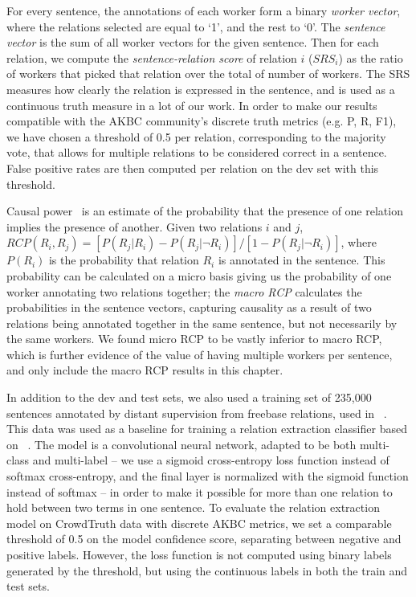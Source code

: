 For every sentence, the annotations of each worker form a binary \textit{worker vector}, where the relations selected are equal to `1', and the rest to `0'. The \textit{sentence vector} is the sum of all worker vectors for the given sentence. Then for each relation, we compute the \textit{sentence-relation score} of relation $i$ ($SRS_i$) as the ratio of workers that picked that relation over the total of number of workers. The SRS measures how clearly the relation is expressed in the sentence, and is used as a continuous truth measure in a lot of our work.  In order to make our results compatible with the AKBC community's discrete truth metrics (e.g. P, R, F1), we have chosen a threshold of 0.5 per relation, corresponding to the majority vote, that allows for multiple relations to be considered correct in a sentence.  False positive rates are then computed per relation on the dev set with this threshold.

Causal power~\cite{cheng1997causalpower} is an estimate of the probability that the presence of one relation implies the presence of another. Given two relations $i$ and $j$, $ RCP(R_i, R_j) = [ P(R_{j} | R_{i} ) - P(R_{j} | \neg R_{i} ) ] / [1 - P(R_{j} | \neg R_{i} )]$, where $P(R_{i})$ is the probability that relation $R_i$ is annotated in the sentence. This probability can be calculated on a micro basis giving us the probability of one worker annotating two relations together; the \textit{macro RCP} calculates the probabilities in the sentence vectors, capturing causality as a result of two relations being annotated together in the same sentence, but not necessarily by the same workers.  We found micro RCP to be vastly inferior to macro RCP, which is further evidence of the value of having multiple workers per sentence, and only include the macro RCP results in this chapter.  

In addition to the dev and test sets, we also used a training set of 235,000 sentences annotated by distant supervision from freebase relations, used in ~\cite{riedel2013universalschema}.  This data was used as a baseline for training a relation extraction classifier based on ~\cite{nguyen2015relation}.  The model is a convolutional neural network, adapted to be both multi-class and multi-label -- we use a sigmoid cross-entropy loss function instead of softmax cross-entropy, and the final layer is normalized with the sigmoid function instead of softmax -- in order to make it possible for more than one relation to hold between two terms in one sentence.
To evaluate the relation extraction model on CrowdTruth data with discrete AKBC metrics, we set a comparable threshold of 0.5 on the model confidence score, separating between negative and positive labels. However, the loss function is not computed using binary labels generated by the threshold, but using the continuous labels in both the train and test sets.

